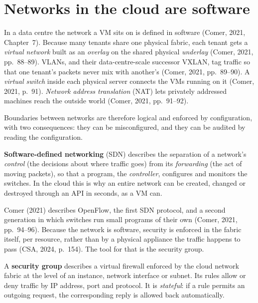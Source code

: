 \section{Networks in the cloud are software}

In a data centre the network a VM sits on is defined in software (Comer,
2021, Chapter~7). Because many tenants share one physical fabric, each
tenant gets a \emph{virtual network} built as an \emph{overlay} on the
shared physical \emph{underlay} (Comer, 2021, pp.~88--89). VLANs, and their
data-centre-scale successor VXLAN, tag traffic so that one tenant's packets
never mix with another's (Comer, 2021, pp.~89--90). A \emph{virtual switch}
inside each physical server connects the VMs running on it (Comer, 2021,
p.~91). \emph{Network address translation} (NAT) lets privately addressed
machines reach the outside world (Comer, 2021, pp.~91--92).

Boundaries between networks are therefore logical and enforced by
configuration, with two consequences: they can be misconfigured, and they
can be audited by reading the configuration.

\begin{definition}\label{def:sdn}
\textbf{Software-defined networking} (SDN) describes the separation of a
network's \emph{control} (the decisions about where traffic goes) from its
\emph{forwarding} (the act of moving packets), so that a program, the
\emph{controller}, configures and monitors the switches. In the cloud this is
why an entire network can be created, changed or destroyed through an API in
seconds, as a VM can.
\end{definition}

Comer (2021) describes OpenFlow, the first SDN protocol, and a second
generation in which switches run small programs of their own (Comer, 2021,
pp.~94--96). Because the network is software, security is enforced in the
fabric itself, per resource, rather than by a physical appliance the traffic
happens to pass (CSA, 2024, p.~154). The tool for that is the security
group.

\begin{definition}\label{def:secgroup}
A \textbf{security group} describes a virtual firewall enforced by the cloud
network fabric at the level of an instance, network interface or subnet. Its
rules allow or deny traffic by IP address, port and protocol. It is
\emph{stateful}: if a rule permits an outgoing request, the corresponding reply
is allowed back automatically.
\end{definition}

